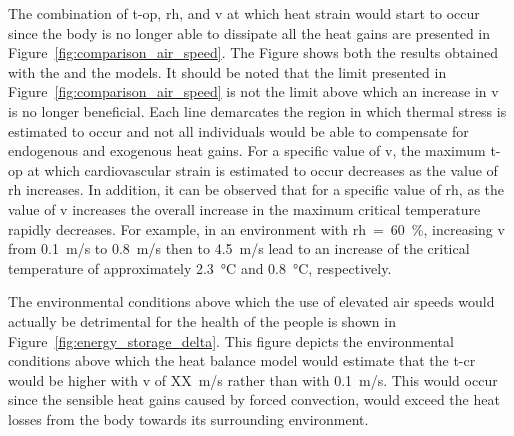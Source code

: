 The combination of \ac{t-op}, \ac{rh}, and \ac{v} at which heat strain would start to occur since the body is no longer able to dissipate all the heat gains are presented in Figure~\ref{fig:comparison_air_speed}.
The Figure shows both the results obtained with the and the  models.
It should be noted that the limit presented in Figure~\ref{fig:comparison_air_speed} is not the limit above which an increase in \ac{v} is no longer beneficial.
Each line demarcates the region in which thermal stress is estimated to occur and not all individuals would be able to compensate for endogenous and exogenous heat gains.
For a specific value of \ac{v}, the maximum \ac{t-op} at which cardiovascular strain is estimated to occur decreases as the value of \ac{rh} increases.
In addition, it can be observed that for a specific value of \ac{rh}, as the value of \ac{v} increases the overall increase in the maximum critical temperature rapidly decreases.
For example, in an environment with \ac{rh}~=~60~\%, increasing \ac{v} from 0.1~m/s to 0.8~m/s then to 4.5~m/s lead to an increase of the critical temperature of approximately 2.3~°C and 0.8~°C, respectively.

The environmental conditions above which the use of elevated air speeds would actually be detrimental for the health of the people is shown in Figure~\ref{fig:energy_storage_delta}.
This figure depicts the environmental conditions above which the heat balance model would estimate that the \ac{t-cr} would be higher with \ac{v} of XX~m/s rather than with 0.1~m/s.
This would occur since the sensible heat gains caused by forced convection, would exceed the heat losses from the body towards its surrounding environment.




